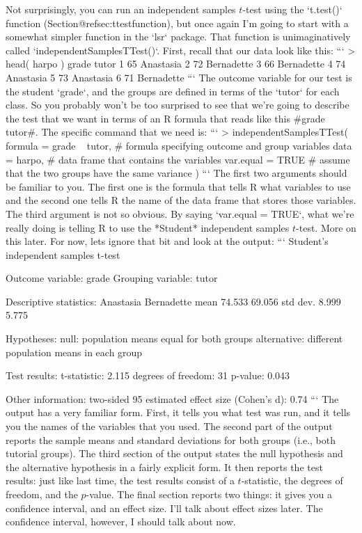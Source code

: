 Not surprisingly, you can run an independent samples $t$-test using the `t.test()` function (Section@refsec:ttestfunction), but once again I'm going to start with a somewhat simpler function in the `lsr` package. That function is unimaginatively called `independentSamplesTTest()`. First, recall that our data look like this: 
```
> head( harpo )
  grade      tutor
1    65  Anastasia
2    72 Bernadette
3    66 Bernadette
4    74  Anastasia
5    73  Anastasia
6    71 Bernadette
```
The outcome variable for our test is the student `grade`, and the groups are defined in terms of the `tutor` for each class. So you probably won't be too surprised to see that we're going to describe the test that we want in terms of an R formula that reads like this \rtextverb#grade ~ tutor#. The specific command that we need is:
```
> independentSamplesTTest( 
      formula = grade ~ tutor,  # formula specifying outcome and group variables
      data = harpo,             # data frame that contains the variables
      var.equal = TRUE          # assume that the two groups have the same variance
  )
```
The first two arguments should be familiar to you. The first one is the formula that tells R what variables to use and the second one tells R the name of the data frame that stores those variables. The third argument is not so obvious. By saying `var.equal = TRUE`, what we're really doing is telling R to use the *Student* independent samples $t$-test. More on this later. For now, lets ignore that bit and look at the output:
```
   Student's independent samples t-test 

Outcome variable:   grade 
Grouping variable:  tutor 

Descriptive statistics: 
            Anastasia Bernadette
   mean        74.533     69.056
   std dev.     8.999      5.775

Hypotheses: 
   null:        population means equal for both groups
   alternative: different population means in each group

Test results: 
   t-statistic:  2.115 
   degrees of freedom:  31 
   p-value:  0.043 

Other information: 
   two-sided 95%
   estimated effect size (Cohen's d):  0.74 
```
The output has a very familiar form. First, it tells you what test was run, and it tells you the names of the variables that you used. The second part of the output reports the sample means and standard deviations for both groups (i.e., both tutorial groups). The third section of the output states the null hypothesis and the alternative hypothesis in a fairly explicit form. It then reports the test results: just like last time, the test results consist of a $t$-statistic, the degrees of freedom, and the $p$-value. The final section reports two things: it gives you a confidence interval, and an effect size. I'll talk about effect sizes later. The confidence interval, however, I should talk about now. 

